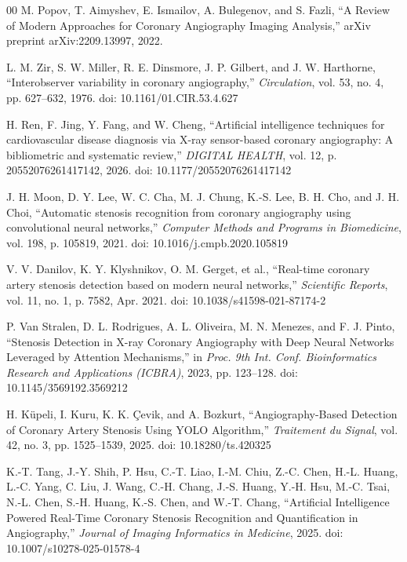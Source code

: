 \documentclass[conference]{IEEEtran}
\begin{document}
\begin{thebibliography}{00}
 M. Popov, T. Aimyshev, E. Ismailov, A. Bulegenov, and S. Fazli, ``A Review of Modern Approaches for Coronary Angiography Imaging Analysis,'' arXiv preprint arXiv:2209.13997, 2022.

 L. M. Zir, S. W. Miller, R. E. Dinsmore, J. P. Gilbert, and J. W. Harthorne, ``Interobserver variability in coronary angiography,'' \textit{Circulation}, vol. 53, no. 4, pp. 627--632, 1976. doi: 10.1161/01.CIR.53.4.627

 H. Ren, F. Jing, Y. Fang, and W. Cheng, ``Artificial intelligence techniques for cardiovascular disease diagnosis via X-ray sensor-based coronary angiography: A bibliometric and systematic review,'' \textit{DIGITAL HEALTH}, vol. 12, p. 20552076261417142, 2026. doi: 10.1177/20552076261417142

 J. H. Moon, D. Y. Lee, W. C. Cha, M. J. Chung, K.-S. Lee, B. H. Cho, and J. H. Choi, ``Automatic stenosis recognition from coronary angiography using convolutional neural networks,'' \textit{Computer Methods and Programs in Biomedicine}, vol. 198, p. 105819, 2021. doi: 10.1016/j.cmpb.2020.105819

 V. V. Danilov, K. Y. Klyshnikov, O. M. Gerget, et al., ``Real-time coronary artery stenosis detection based on modern neural networks,'' \textit{Scientific Reports}, vol. 11, no. 1, p. 7582, Apr. 2021. doi: 10.1038/s41598-021-87174-2

 P. Van Stralen, D. L. Rodrigues, A. L. Oliveira, M. N. Menezes, and F. J. Pinto, ``Stenosis Detection in X-ray Coronary Angiography with Deep Neural Networks Leveraged by Attention Mechanisms,'' in \textit{Proc. 9th Int. Conf. Bioinformatics Research and Applications (ICBRA)}, 2023, pp. 123--128. doi: 10.1145/3569192.3569212

 H. K\"upeli, I. Kuru, K. K. \c{C}evik, and A. Bozkurt, ``Angiography-Based Detection of Coronary Artery Stenosis Using YOLO Algorithm,'' \textit{Traitement du Signal}, vol. 42, no. 3, pp. 1525--1539, 2025. doi: 10.18280/ts.420325

 K.-T. Tang, J.-Y. Shih, P. Hsu, C.-T. Liao, I.-M. Chiu, Z.-C. Chen, H.-L. Huang, L.-C. Yang, C. Liu, J. Wang, C.-H. Chang, J.-S. Huang, Y.-H. Hsu, M.-C. Tsai, N.-L. Chen, S.-H. Huang, K.-S. Chen, and W.-T. Chang, ``Artificial Intelligence Powered Real-Time Coronary Stenosis Recognition and Quantification in Angiography,'' \textit{Journal of Imaging Informatics in Medicine}, 2025. doi: 10.1007/s10278-025-01578-4


\end{thebibliography}
\end{document}

